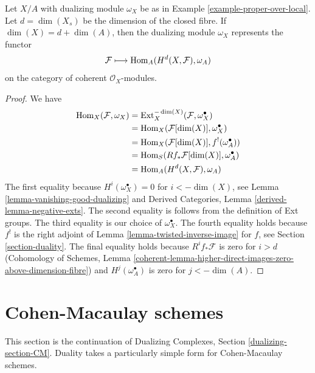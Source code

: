 \begin{lemma}
\label{lemma-dualizing-module-proper-over-A}
Let $X/A$ with dualizing module $\omega_X$ be as in
Example \ref{example-proper-over-local}.
Let $d = \dim(X_s)$ be the dimension
of the closed fibre. If $\dim(X) = d + \dim(A)$, then
the dualizing module $\omega_X$ represents the functor
$$
\mathcal{F} \longmapsto \mathop{\mathrm{Hom}}\nolimits_A(H^d(X, \mathcal{F}), \omega_A)
$$
on the category of coherent $\mathcal{O}_X$-modules.
\end{lemma}

\begin{proof}
We have
\begin{align*}
\mathop{\mathrm{Hom}}\nolimits_X(\mathcal{F}, \omega_X)
& =
\mathop{\mathrm{Ext}}\nolimits^{-\dim(X)}_X(\mathcal{F}, \omega_X^\bullet) \\
& =
\mathop{\mathrm{Hom}}\nolimits_X(\mathcal{F}[\dim(X)], \omega_X^\bullet) \\
& =
\mathop{\mathrm{Hom}}\nolimits_X(\mathcal{F}[\dim(X)], f^!(\omega_A^\bullet)) \\
& =
\mathop{\mathrm{Hom}}\nolimits_S(Rf_*\mathcal{F}[\dim(X)], \omega_A^\bullet) \\
& =
\mathop{\mathrm{Hom}}\nolimits_A(H^d(X, \mathcal{F}), \omega_A)
\end{align*}
The first equality because $H^i(\omega_X^\bullet) = 0$ for
$i < -\dim(X)$, see Lemma \ref{lemma-vanishing-good-dualizing} and
Derived Categories, Lemma \ref{derived-lemma-negative-exts}.
The second equality is follows from the definition of Ext groups.
The third equality is our choice of $\omega_X^\bullet$.
The fourth equality holds because $f^!$ is the
right adjoint of Lemma \ref{lemma-twisted-inverse-image} for
$f$, see Section \ref{section-duality}.
The final equality holds because $R^if_*\mathcal{F}$ is zero
for $i > d$ (Cohomology of Schemes, Lemma
\ref{coherent-lemma-higher-direct-images-zero-above-dimension-fibre})
and $H^j(\omega_A^\bullet)$ is zero for $j < -\dim(A)$.
\end{proof}








\section{Cohen-Macaulay schemes}
\label{section-CM}

\noindent
This section is the continuation of Dualizing Complexes, Section
\ref{dualizing-section-CM}.
Duality takes a particularly simple form for Cohen-Macaulay schemes.

